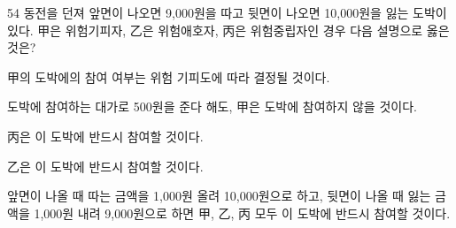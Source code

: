 \begin{question}{54}
동전을 던져 앞면이 나오면 9,000원을 따고 뒷면이 나오면 10,000원을 잃는 도박이 있다. 甲은 위험기피자, 乙은 위험애호자, 丙은 위험중립자인 경우 다음 설명으로 옳은 것은?
\begin{choices}
  \item 甲의 도박에의 참여 여부는 위험 기피도에 따라 결정될 것이다.
  \item 도박에 참여하는 대가로 500원을 준다 해도, 甲은 도박에 참여하지 않을 것이다.
  \item 丙은 이 도박에 반드시 참여할 것이다.
  \item 乙은 이 도박에 반드시 참여할 것이다.
  \item 앞면이 나올 때 따는 금액을 1,000원 올려 10,000원으로 하고, 뒷면이 나올 때 잃는 금액을 1,000원 내려 9,000원으로 하면 甲, 乙, 丙 모두 이 도박에 반드시 참여할 것이다.
\end{choices}
\end{question}

